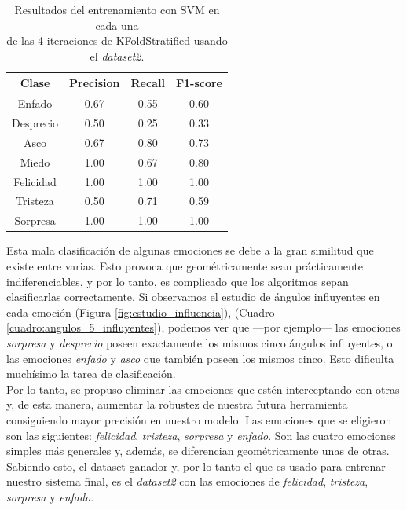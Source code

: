 \begin{table}[h!]
\begin{minipage}{0.48\linewidth}
\begin{adjustbox}{max width=\textwidth}
\begin{tabular}{|c|c|c|c|}
\hline
\textbf{Clase} & \textbf{Precision} & \textbf{Recall} & \textbf{F1-score}\\
\hline
     Enfado & 0.67 & 0.55 & 0.60\\
     Desprecio & 0.50 & 0.25 & 0.33\\
     Asco & 0.67 & 0.80 & 0.73\\
     Miedo & 1.00 & 0.67 & 0.80\\
     Felicidad & 1.00 & 1.00 & 1.00\\
     Tristeza & 0.50 & 0.71 & 0.59\\
     Sorpresa & 1.00 & 1.00 & 1.00\\
\hline
\end{tabular}
\end{adjustbox}
\end{minipage}
\captionsetup{justification=centering}
\caption{Resultados del entrenamiento con SVM en cada una\\
de las 4 iteraciones de KFoldStratified usando el \textit{dataset2}.}
\label{cuadro:resultados_SVM}
\end{table}

Esta mala clasificación de algunas emociones se debe a la gran similitud que existe entre varias. Esto provoca que geométricamente sean prácticamente indiferenciables, y por lo tanto, es complicado que los algoritmos sepan clasificarlas correctamente. Si observamos el estudio de ángulos influyentes en cada emoción (Figura \ref{fig:estudio_influencia}), (Cuadro \ref{cuadro:angulos_5_influyentes}), podemos ver que ---por ejemplo--- las emociones \textit{sorpresa} y \textit{desprecio} poseen exactamente los mismos cinco ángulos influyentes, o las emociones \textit{enfado} y \textit{asco} que también poseen los mismos cinco. Esto dificulta muchísimo la tarea de clasificación.\\

Por lo tanto, se propuso eliminar las emociones que estén interceptando con otras y, de esta manera, aumentar la robustez de nuestra futura herramienta consiguiendo mayor precisión en nuestro modelo. Las emociones que se eligieron son las siguientes: \textit{felicidad}, \textit{tristeza}, \textit{sorpresa} y \textit{enfado}. Son las cuatro emociones simples más generales y, además, se diferencian geométricamente unas de otras. Sabiendo esto, el dataset ganador y, por lo tanto el que es usado para entrenar nuestro sistema final, es el \textit{dataset2} con las emociones de \textit{felicidad}, \textit{tristeza}, \textit{sorpresa} y \textit{enfado}.

